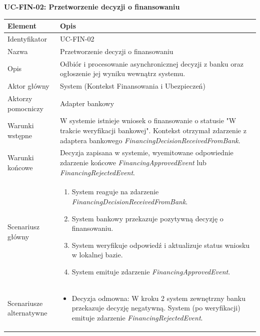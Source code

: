 \textbf{UC-FIN-02: Przetworzenie decyzji o finansowaniu}

\begin{longtable}{|p{4cm}|p{11cm}|}
\hline
\textbf{Element} & \textbf{Opis} \\
\hline

Identyfikator & UC-FIN-02 \\
\hline

Nazwa & Przetworzenie decyzji o finansowaniu \\
\hline

Opis & 
Odbiór i procesowanie asynchronicznej decyzji z banku oraz ogłoszenie jej wyniku wewnątrz systemu. \\
\hline

Aktor główny & System (Kontekst Finansowania i Ubezpieczeń) \\
\hline

Aktorzy pomocniczy & Adapter bankowy \\
\hline

Warunki wstępne & 
W systemie istnieje wniosek o finansowanie o statusie "W trakcie weryfikacji bankowej". Kontekst otrzymał zdarzenie z adaptera bankowego \textit{FinancingDecisionReceivedFromBank}. \\
\hline

Warunki końcowe & 
Decyzja zapisana w systemie, wyemitowane odpowiednie zdarzenie końcowe \textit{FinancingApprovedEvent} lub \textit{FinancingRejectedEvent}. \\
\hline

Scenariusz główny & 
\begin{enumerate}
    \item System reaguje na zdarzenie \textit{FinancingDecisionReceivedFromBank}.
    \item System bankowy przekazuje pozytywną decyzję o finansowaniu.
    \item System weryfikuje odpowiedź i aktualizuje status wniosku w lokalnej bazie.
    \item System emituje zdarzenie \textit{FinancingApprovedEvent}.
\end{enumerate} \\
\hline

Scenariusze alternatywne & 
\begin{itemize}
    \item [A1] Decyzja odmowna: W kroku 2 system zewnętrzny banku przekazuje decyzję negatywną. System (po weryfikacji) emituje zdarzenie \textit{FinancingRejectedEvent}.
\end{itemize} \\
\hline
\end{longtable}
